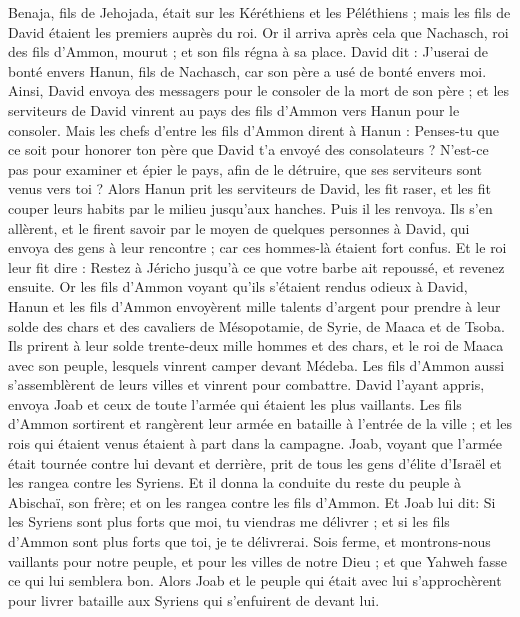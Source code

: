 \begin{multicols}{2}
Benaja, fils de Jehojada, était sur les Kéréthiens et les Péléthiens ; mais les fils de David étaient les premiers auprès du roi.
\VerseOne{}Or il arriva après cela que Nachasch, roi des fils d'Ammon, mourut ; et son fils régna à sa place.
David dit : J'userai de bonté envers Hanun, fils de Nachasch, car son père a usé de bonté envers moi. Ainsi, David envoya des messagers pour le consoler de la mort de son père ; et les serviteurs de David vinrent au pays des fils d'Ammon vers Hanun pour le consoler.
Mais les chefs d'entre les fils d'Ammon dirent à Hanun : Penses-tu que ce soit pour honorer ton père que David t'a envoyé des consolateurs ? N'est-ce pas pour examiner et épier le pays, afin de le détruire, que ses serviteurs sont venus vers toi ?
Alors Hanun prit les serviteurs de David, les fit raser, et les fit couper leurs habits par le milieu jusqu'aux hanches. Puis il les renvoya.
Ils s'en allèrent, et le firent savoir par le moyen de quelques personnes à David, qui envoya des gens à leur rencontre ; car ces hommes-là étaient fort confus. Et le roi leur fit dire : Restez à Jéricho jusqu'à ce que votre barbe ait repoussé, et revenez ensuite.
Or les fils d'Ammon voyant qu'ils s'étaient rendus odieux à David, Hanun et les fils d'Ammon envoyèrent mille talents d'argent pour prendre à leur solde des chars et des cavaliers de Mésopotamie, de Syrie, de Maaca et de Tsoba.
Ils prirent à leur solde trente-deux mille hommes et des chars, et le roi de Maaca avec son peuple, lesquels vinrent camper devant Médeba. Les fils d'Ammon aussi s'assemblèrent de leurs villes et vinrent pour combattre.
David l'ayant appris, envoya Joab et ceux de toute l'armée qui étaient les plus vaillants.
Les fils d'Ammon sortirent et rangèrent leur armée en bataille à l'entrée de la ville ; et les rois qui étaient venus étaient à part dans la campagne.
Joab, voyant que l'armée était tournée contre lui devant et derrière, prit de tous les gens d'élite d'Israël et les rangea contre les Syriens.
Et il donna la conduite du reste du peuple à Abischaï, son frère; et on les rangea contre les fils d'Ammon.
Et Joab lui dit: Si les Syriens sont plus forts que moi, tu viendras me délivrer ; et si les fils d'Ammon sont plus forts que toi, je te délivrerai.
Sois ferme, et montrons-nous vaillants pour notre peuple, et pour les villes de notre Dieu ; et que Yahweh fasse ce qui lui semblera bon.
Alors Joab et le peuple qui était avec lui s'approchèrent pour livrer bataille aux Syriens qui s'enfuirent de devant lui.

\end{multicols}
